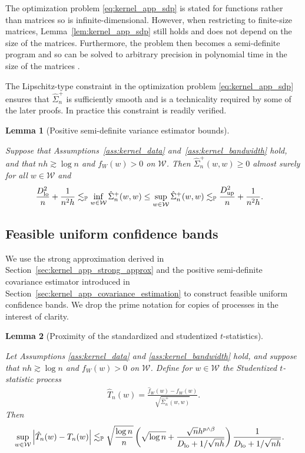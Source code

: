 \documentclass[11pt,lof]{puthesis}
\renewcommand{\P}{\ensuremath{\mathbb{P}}}
\newcommand{\cW}{\ensuremath{\mathcal{W}}}
\newcommand{\Dl}{\ensuremath{D_{\textup{lo}}}}
\newcommand{\Du}{\ensuremath{D_{\textup{up}}}}
\theoremstyle{break}
\newtheorem{lemma}{Lemma}[section]
\theoremstyle{proof}
\begin{document}
The optimization problem \eqref{eq:kernel_app_sdp} is stated for functions
rather than
matrices so is infinite-dimensional. However, when restricting to finite-size
matrices, Lemma~\ref{lem:kernel_app_sdp} still holds and does not depend on the
size
of the matrices. Furthermore, the problem then becomes a semi-definite program
and so can be solved to arbitrary precision in polynomial time in the size of
the matrices \citep{laurent2005semidefinite}.

The Lipschitz-type constraint in the optimization problem
\eqref{eq:kernel_app_sdp}
ensures that $\hat \Sigma_n^+$ is sufficiently smooth and is a technicality
required by some of the later proofs. In practice this constraint is readily
verified.

\begin{lemma}[Positive semi-definite variance estimator bounds]
  \label{lem:kernel_app_variance_estimator_bounds}

  Suppose that Assumptions~\ref{ass:kernel_data}
  and~\ref{ass:kernel_bandwidth} hold, and that
  $n h \gtrsim \log n$ and $f_W(w) > 0$ on $\cW$.
  Then $\hat \Sigma_n^+(w,w) \geq 0$
  almost surely for all $w \in \cW$ and
  \begin{align*}
    \frac{\Dl^2}{n} + \frac{1}{n^2h}
    &\lesssim_\P
    \inf_{w \in \cW} \hat \Sigma_n^+(w,w)
    \leq
    \sup_{w \in \cW} \hat \Sigma_n^+(w,w)
    \lesssim_\P
    \frac{\Du^2}{n} + \frac{1}{n^2h}.
  \end{align*}

\end{lemma}

\subsection{Feasible uniform confidence bands}

We use the strong approximation derived in
Section~\ref{sec:kernel_app_strong_approx} and the
positive semi-definite covariance estimator introduced in
Section~\ref{sec:kernel_app_covariance_estimation} to construct feasible
uniform
confidence bands. We drop the prime notation for copies of processes
in the interest of clarity.

\begin{lemma}[Proximity of the standardized and studentized $t$-statistics]
  \label{lem:kernel_app_studentized_t_statistic}

  Let Assumptions \ref{ass:kernel_data} and
  \ref{ass:kernel_bandwidth} hold, and suppose that
  $n h \gtrsim \log n$ and $f_W(w) > 0$ on $\cW$.
  Define for $w \in \cW$
  the Studentized $t$-statistic process
  \begin{align*}
    \hat T_n(w) = \frac{\hat f_W(w) - f_W(w)}
    {\sqrt{\hat\Sigma_n^+(w,w)}}.
  \end{align*}
  Then
  \begin{align*}
    \sup_{w \in \cW}
    \left| \hat T_n(w) - T_n(w) \right|
    &\lesssim_\P
    \sqrt{\frac{\log n}{n}}
    \left(
      \sqrt{\log n} + \frac{\sqrt n h^{p \wedge \beta}}
      {\Dl + 1/\sqrt{n h}}
    \right)
    \frac{1}{\Dl + 1/\sqrt{n h}}.
  \end{align*}

\end{lemma}
\end{document}
